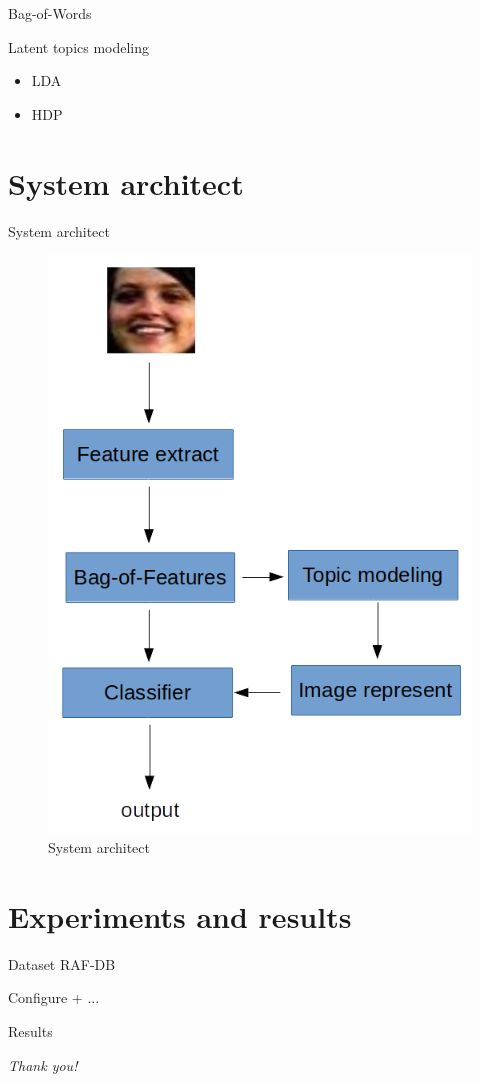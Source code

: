 \documentclass{beamer}
\begin{document}
\begin{frame}{Bag-of-Words}
    
\end{frame}

\begin{frame}{Latent topics modeling}
    \begin{itemize}
        \item<1-> LDA
        \item<2-> HDP
    \end{itemize}
\end{frame}

\section{System architect}
\begin{frame}{System architect}
    \begin{figure}
        \centering
        \includegraphics[width=.45\textwidth]{system-arch-cropped.png}
        \caption{System architect}
        \label{fig:system-architect}
    \end{figure}
\end{frame}

\section{Experiments and results}
\begin{frame}{Dataset}
    RAF-DB
\end{frame}

\begin{frame}{Configure + ...}
    
\end{frame}

\begin{frame}{Results}
    
\end{frame}

\begin{frame}{}
  \centering \Large
  \emph{Thank you!}
\end{frame}

\end{document}
